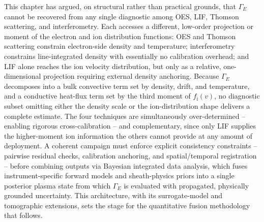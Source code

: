 This chapter has argued, on structural rather than practical grounds, that $\Gamma_{E}$ cannot be recovered from any single diagnostic among OES, LIF, Thomson scattering, and interferometry. Each accesses a different, low-order projection or moment of the electron and ion distribution functions: OES and Thomson scattering constrain electron-side density and temperature; interferometry constrains line-integrated density with essentially no calibration overhead; and LIF alone reaches the ion velocity distribution, but only as a relative, one-dimensional projection requiring external density anchoring. Because $\Gamma_{E}$ decomposes into a bulk convective term set by density, drift, and temperature, and a conductive heat-flux term set by the third moment of $f_{\mathrm{i}}(v)$, no diagnostic subset omitting either the density scale or the ion-distribution shape delivers a complete estimate. The four techniques are simultaneously over-determined -- enabling rigorous cross-calibration -- and complementary, since only LIF supplies the higher-moment ion information the others cannot provide at any amount of deployment. A coherent campaign must enforce explicit consistency constraints -- pairwise residual checks, calibration anchoring, and spatial/temporal registration -- before combining outputs via Bayesian integrated data analysis, which fuses instrument-specific forward models and sheath-physics priors into a single posterior plasma state from which $\Gamma_{E}$ is evaluated with propagated, physically grounded uncertainty. This architecture, with its surrogate-model and tomographic extensions, sets the stage for the quantitative fusion methodology that follows.
